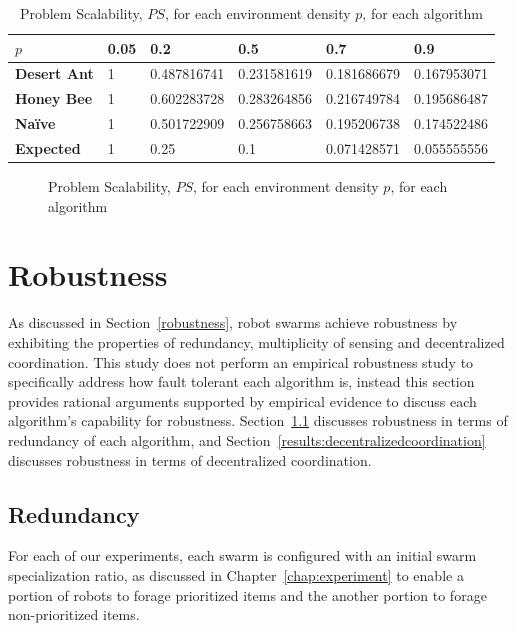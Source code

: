 \begin{table}[]
\centering
\caption{Problem Scalability, $PS$, for each environment density $p$, for each algorithm}
\label{table:problemscalability}
\begin{tabular}{@{}llllll@{}}
\toprule
\textbf{$p$}                  & \textbf{0.05} & \textbf{0.2        } & \textbf{0.5}         & \textbf{0.7}         & \textbf{0.9}         \\ \midrule
\textbf{Desert Ant}           & 1    & 0.487816741 & 0.231581619 & 0.181686679 & 0.167953071 \\
\textbf{Honey Bee}            & 1    & 0.602283728 & 0.283264856 & 0.216749784 & 0.195686487 \\
\textbf{Na\"ive}              & 1    & 0.501722909 & 0.256758663 & 0.195206738 & 0.174522486 \\
\textbf{Expected} & 1    & 0.25        & 0.1         & 0.071428571 & 0.055555556 \\ \bottomrule
\end{tabular}
\end{table}

\begin{figure}[!htb]
\centering
\resizebox{\textwidth}{!}{}
\caption{Problem Scalability, $PS$, for each environment density $p$, for each algorithm}
\label{fig:problemscalability}
\end{figure}

\section{Robustness}
\label{results:robustness}
As discussed in Section~\ref{robustness}, robot swarms achieve robustness by exhibiting the properties of redundancy, multiplicity of sensing and decentralized coordination. This study does not perform an empirical robustness study to specifically address how fault tolerant each algorithm is, instead this section provides rational arguments supported by empirical evidence to discuss each  algorithm's capability for robustness. Section~\ref{results:redundancy} discusses robustness in terms of redundancy of each algorithm, and Section~\ref{results:decentralizedcoordination} discusses robustness in terms of decentralized coordination.

\subsection{Redundancy}
\label{results:redundancy}
For each of our experiments, each swarm is configured with an initial swarm specialization ratio, as discussed in Chapter~\ref{chap:experiment} to enable a portion of robots to forage prioritized items and the another portion to forage non-prioritized items. 

